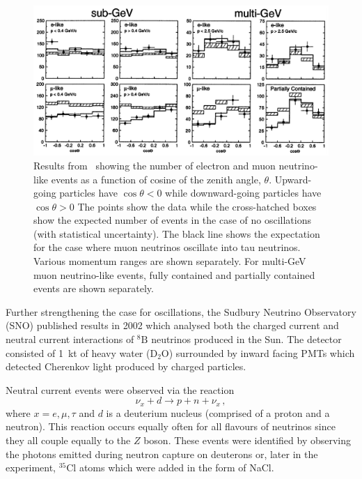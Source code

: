 \begin{figure}[h]
  \centering
  \includegraphics[width=\linewidth]{files/figures/theory/superKResults}
  \caption[Super-Kamiokande atmospheric neutrino results as a function of zenith angle.]{Results from~\cite{superK} showing the number of electron and muon neutrino-like events as a function of cosine of the zenith angle, $\theta$. Upward-going particles have $\cos\theta<0$ while downward-going particles have $\cos\theta>0$ The points show the data while the cross-hatched boxes show the expected number of events in the case of no oscillations (with statistical uncertainty). The black line shows the expectation for the case where muon neutrinos oscillate into tau neutrinos. Various momentum ranges are shown separately. For multi-GeV muon neutrino-like events, fully contained and partially contained events are shown separately.}
  \label{fig:superKResults}
\end{figure}

Further strengthening the case for oscillations, the Sudbury Neutrino Observatory (SNO) published results in 2002 which analysed both the charged current and neutral current interactions of $^{8}\text{B}$ neutrinos produced in the Sun.
The detector consisted of \SI{1}{\kilo\tonne} of heavy water ($\text{D}_{2}\text{O}$) surrounded by inward facing PMTs which detected Cherenkov light produced by charged particles.

Neutral current events were observed via the reaction
\begin{equation}
  \nu_{x} + d \rightarrow p + n + \nu_{x} \, ,
\end{equation}
where $x = e, \mu, \tau$ and $d$ is a deuterium nucleus (comprised of a proton and a neutron).
This reaction occurs equally often for all flavours of neutrinos since they all couple equally to the $Z$ boson.
These events were identified by observing the photons emitted during neutron capture on deuterons or, later in the experiment, $^{35}\text{Cl}$ atoms which were added in the form of NaCl.  

